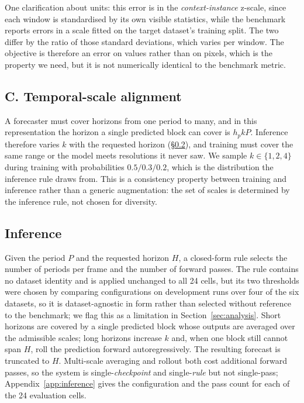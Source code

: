 One clarification about units: this error is in the \emph{context-instance} z-scale, since each
window is standardised by its own visible statistics, while the benchmark reports errors in a scale
fitted on the target dataset's training split. The two differ by the ratio of those standard
deviations, which varies per window. The objective is therefore an error on values rather than on
pixels, which is the property we need, but it is not numerically identical to the benchmark
metric.

\subsection{C. Temporal-scale alignment}
\label{sec:scale}

A forecaster must cover horizons from one period to many, and in this representation the horizon a
single predicted block can cover is $h_p k P$. Inference therefore varies $k$ with the requested
horizon (\S\ref{sec:inference}), and training must cover the same range or the model meets
resolutions it never saw. We sample $k\in\{1,2,4\}$ during training with probabilities
$0.5/0.3/0.2$, which is the distribution the inference rule draws from. This is a consistency
property between training and inference rather than a generic augmentation: the
set of scales is determined by the inference rule, not chosen for diversity.

\subsection{Inference}
\label{sec:inference}

Given the period $P$ and the requested horizon $H$, a closed-form rule selects the number of periods
per frame and the number of forward passes. The rule contains no dataset identity and is applied
unchanged to all 24 cells, but its two thresholds were chosen by comparing configurations on
development runs over four of the six datasets, so it is dataset-agnostic in form rather than
selected without reference to the benchmark; we flag this as a limitation in
Section~\ref{sec:analysis}. Short
horizons are covered by a single predicted block whose outputs are averaged over the admissible
scales; long horizons increase $k$ and, when one block still cannot span $H$, roll the prediction
forward autoregressively. The resulting forecast is truncated to $H$. Multi-scale averaging and
rollout both cost additional forward passes, so the system is single-\emph{checkpoint} and
single-\emph{rule} but not single-pass; Appendix~\ref{app:inference} gives the configuration and the
pass count for each of the 24 evaluation cells.

